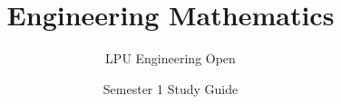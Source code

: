 \documentclass[a4paper,11pt,oneside,openany]{book}
\title{Engineering Mathematics}
\author{LPU Engineering Open}
\date{Semester 1 Study Guide}
\begin{document}
\frontmatter

\makebookcover
\copyrightpage
\disclaimerpage

\tableofcontents
\newpage

\mainmatter








\end{document}
